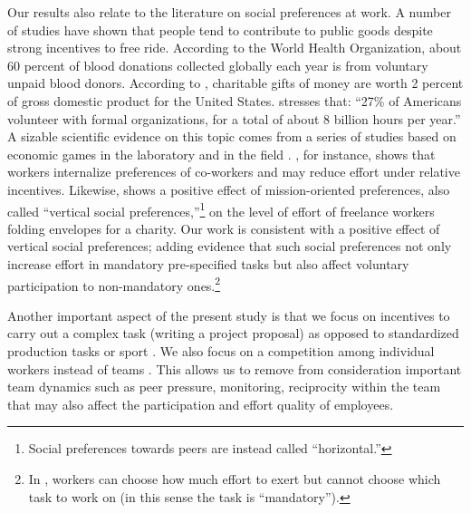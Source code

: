 \documentclass[11pt, titlepage]{article}
\begin{document}
Our results also relate to the literature on social preferences at work.
A number of studies have shown that people tend to contribute to public
goods despite strong incentives to free ride. According to the World
Health Organization, about 60 percent of blood donations collected
globally each year is from voluntary unpaid blood donors. According to
\citet{list2011market}, charitable gifts of money are worth 2 percent of
gross domestic product for the United States.
\citet{lacetera2014rewarding} stresses that: ``27\% of Americans
volunteer with formal organizations, for a total of about 8 billion
hours per year.'' A sizable scientific evidence on this topic comes from
a series of studies based on economic games in the laboratory
\citep[see][ for a review]{levitt2007laboratory} and in the field
\citep{bandiera2005social, dellavigna2016estimating}.
\citet{bandiera2005social}, for instance, shows that workers internalize
preferences of co-workers and may reduce effort under relative
incentives. Likewise, \citet{dellavigna2016estimating} shows a positive
effect of mission-oriented preferences, also called ``vertical social
preferences,''\footnote{Social preferences towards peers are instead
  called ``horizontal.''} on the level of effort of freelance workers
folding envelopes for a charity. Our work is consistent with a positive
effect of vertical social preferences; adding evidence that such social
preferences not only increase effort in mandatory pre-specified tasks
but also affect voluntary participation to non-mandatory ones.\footnote{In
  \citet{dellavigna2016estimating}, workers can choose how much effort
  to exert but cannot choose which task to work on (in this sense the
  task is ``mandatory'').}

Another important aspect of the present study is that we focus on
incentives to carry out a complex task (writing a project proposal) as
opposed to standardized production tasks \citep{knoeber1994testing} or
sport \citep{ehrenberg1990tournaments}. We also focus on a competition
among individual workers instead of teams
\citep[e.g.,][\citet{hamilton2003team} and more recently
\citet{gibbs2014field}]{erev1993constructive}. This allows us to remove
from consideration important team dynamics such as peer pressure,
monitoring, reciprocity within the team that may also affect the
participation and effort quality of employees.
\end{document}
